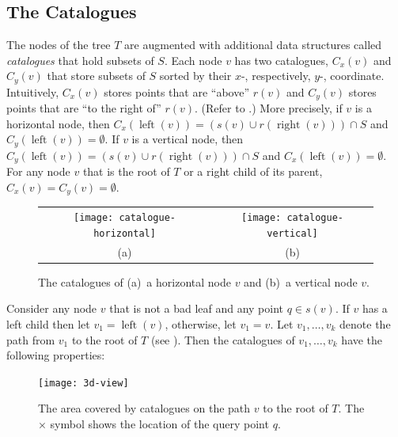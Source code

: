 \documentclass{patmorin}
\DeclareMathOperator{\lft}{left}
\DeclareMathOperator{\rght}{right}
\begin{document}
\subsection{The Catalogues}

The nodes of the tree $T$ are augmented with additional data
structures called \emph{catalogues} that hold subsets of $S$.  Each
node $v$ has two catalogues, $C_x(v)$ and $C_y(v)$ that store subsets
of $S$ sorted by their $x$-, respectively, $y$-, coordinate.
Intuitively, $C_x(v)$ stores points that are ``above'' $r(v)$ and
$C_y(v)$ stores points that are ``to the right of'' $r(v)$.  (Refer to
.)  More precisely, if $v$ is a horizontal node,
then $C_x(\lft(v))= (s(v)\cup r(\rght(v)))\cap S$ and
$C_y(\lft(v))=\emptyset$.  If $v$ is a vertical node, then
$C_y(\lft(v)) = (s(v)\cup r(\rght(v)))\cap S$ and
$C_x(\lft(v))=\emptyset$.  For any node $v$ that is the root of $T$ or
a right child of its parent, $C_x(v)=C_y(v)=\emptyset$.  

\begin{figure}
  \begin{center}
    \begin{tabular}{c|c}
      \texttt{[image: catalogue-horizontal]} &
        \texttt{[image: catalogue-vertical]} \\
       (a) & (b) 
    \end{tabular}
  \end{center}
  \caption{The catalogues of (a)~a horizontal node $v$ and (b)~a
  vertical node $v$.}
\end{figure}


Consider any node $v$ that is not a bad leaf and any point $q\in s(v)$.
If $v$ has a left child then let $v_1=\lft(v)$, otherwise, let
$v_1=v$.
Let $v_1,\ldots,v_k$ denote the path from $v_1$ to the root of $T$
(see ).  Then the catalogues of $v_1,\ldots,v_k$ have
the following properties:
\begin{figure}
  \begin{center}
    \texttt{[image: 3d-view]}
  \end{center}
  \caption{The area covered by catalogues on the path $v$ to the root
of $T$. The $\times$ symbol shows the location of the query point $q$.}
\end{figure}
\end{document}
